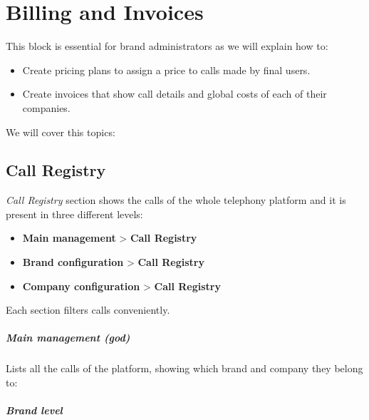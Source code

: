 \documentclass[letterpaper,10pt,english]{sphinxmanual}
\begin{document}
\noindent{}


\chapter{Billing and Invoices}
\label{billing_and_invoices/index::doc}\label{billing_and_invoices/index:billing-and-invoices}
This block is essential for brand administrators as we will explain how to:
\begin{itemize}
\item {} 
Create pricing plans to assign a price to calls made by final users.

\item {} 
Create invoices that show call details and global costs of each of their companies.

\end{itemize}

We will cover this topics:


\section{Call Registry}
\label{billing_and_invoices/call_registry::doc}\label{billing_and_invoices/call_registry:call-registry}\label{billing_and_invoices/call_registry:id1}
\emph{Call Registry} section shows the calls of the whole telephony platform and it
is present in three different levels:
\begin{itemize}
\item {} 
\textbf{Main management} \textgreater{} \textbf{Call Registry}

\item {} 
\textbf{Brand configuration} \textgreater{} \textbf{Call Registry}

\item {} 
\textbf{Company configuration} \textgreater{} \textbf{Call Registry}

\end{itemize}

Each section filters calls conveniently.
\paragraph{Main management (god)}

Lists all the calls of the platform, showing which brand and company they belong to:

\noindent{}
\paragraph{Brand level}
\end{document}
